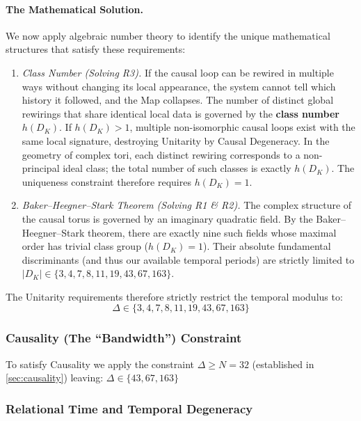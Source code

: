 \paragraph{The Mathematical Solution.} We now apply algebraic number theory to identify the unique mathematical structures that satisfy these requirements:
\begin{enumerate}
    \item[\textbf{(M1)}] \emph{Class Number (Solving R3).} If the causal loop can be rewired in multiple ways without changing its local appearance, the system cannot tell which history it followed, and the Map collapses. The number of distinct global rewirings that share identical local data is governed by the \textbf{class number} $h(D_K)$. If $h(D_K) > 1$, multiple non-isomorphic causal loops exist with the same local signature, destroying Unitarity by Causal Degeneracy. In the geometry of complex tori, each distinct rewiring corresponds to a non-principal ideal class; the total number of such classes is exactly $h(D_K)$. The uniqueness constraint therefore requires $h(D_K) = 1$.

    \item[\textbf{(M2)}] \emph{Baker--Heegner--Stark Theorem (Solving R1 \& R2).} The complex structure of the causal torus is governed by an imaginary quadratic field. By the Baker--Heegner--Stark theorem, there are exactly nine such fields whose maximal order has trivial class group ($h(D_K)=1$). Their absolute fundamental discriminants (and thus our available temporal periods) are strictly limited to $|D_K| \in \{3, 4, 7, 8, 11, 19, 43, 67, 163\}$.
\end{enumerate}

The Unitarity requirements therefore strictly restrict the temporal modulus to:
\begin{equation}
    \Delta \in \{3, 4, 7, 8, 11, 19, 43, 67, 163\}
\end{equation}

\subsubsection{Causality (The ``Bandwidth'') Constraint}
\label{sec:fundamental_resonance_filter2}
To satisfy Causality we apply the constraint \linebreak $\Delta \ge N = 32$ (established in \cref{sec:causality}) leaving: $\Delta \in \{43, 67, 163\}$

\subsubsection{Relational Time and Temporal Degeneracy}
\label{sec:relational_time_constraint}

